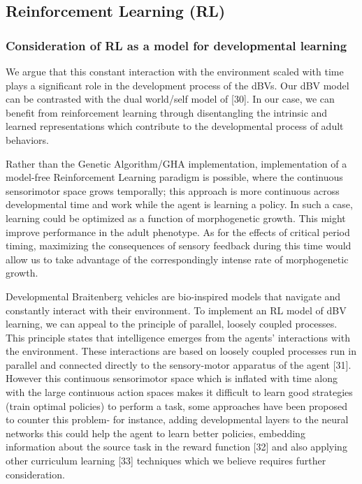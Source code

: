 \documentclass{article}
\begin{document}
\subsection*{Reinforcement Learning (RL)}

\subsubsection*{Consideration of RL as a model for developmental learning}

We argue that this constant interaction with the environment scaled with time plays a significant role in the development process of the dBVs. Our dBV model can be contrasted with the dual world/self model of [30]. In our case, we can benefit from reinforcement learning through disentangling the intrinsic and learned representations which contribute to the developmental process of adult behaviors. 

Rather than the Genetic Algorithm/GHA implementation, implementation of a model-free Reinforcement Learning paradigm is possible, where the continuous sensorimotor space grows temporally; this approach is more continuous across developmental time and work while the agent is learning a policy. In such a case, learning could be optimized as a function of morphogenetic growth. This might improve performance in the adult phenotype. As for the effects of critical period timing, maximizing the consequences of sensory feedback during this time would allow us to take advantage of the correspondingly intense rate of morphogenetic growth.

Developmental Braitenberg vehicles are bio-inspired models that navigate and constantly interact with their environment. To implement an RL model of dBV learning, we can appeal to the principle of parallel, loosely coupled processes.  This principle states that intelligence emerges from the agents' interactions with the environment. These interactions are based on loosely coupled processes run in parallel and connected directly to the sensory-motor apparatus of the agent [31]. However this continuous sensorimotor space which is inflated with time along with the large continuous action spaces makes it difficult to learn good strategies (train optimal policies) to perform a task, some approaches have been proposed to counter this problem- for instance, adding developmental layers to the neural networks this could help the agent to learn better policies, embedding information about the source task in the reward function [32] and also applying other curriculum learning [33] techniques which we believe requires further consideration.
\end{document}
